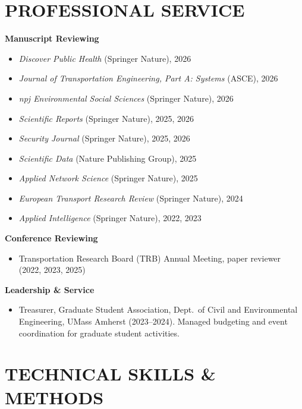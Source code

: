 \documentclass[10pt, a4paper]{article}
\begin{document}
\section{PROFESSIONAL SERVICE}

\textbf{Manuscript Reviewing}
\begin{itemize}
  \item \textit{Discover Public Health} (Springer Nature), 2026
  \item \textit{Journal of Transportation Engineering, Part A: Systems} (ASCE), 2026
  \item \textit{npj Environmental Social Sciences} (Springer Nature), 2026
  \item \textit{Scientific Reports} (Springer Nature), 2025, 2026
  \item \textit{Security Journal} (Springer Nature), 2025, 2026
  \item \textit{Scientific Data} (Nature Publishing Group), 2025
  \item \textit{Applied Network Science} (Springer Nature), 2025
  \item \textit{European Transport Research Review} (Springer Nature), 2024
  \item \textit{Applied Intelligence} (Springer Nature), 2022, 2023
\end{itemize}

\vspace{4pt}
\textbf{Conference Reviewing}
\begin{itemize}
  \item Transportation Research Board (TRB) Annual Meeting, paper reviewer (2022, 2023, 2025)
\end{itemize}

\vspace{4pt}
\textbf{Leadership \& Service}
\begin{itemize}
  \item Treasurer, Graduate Student Association, Dept.\ of Civil and Environmental Engineering, UMass Amherst (2023--2024). Managed budgeting and event coordination for graduate student activities.
\end{itemize}

\section{TECHNICAL SKILLS \& METHODS}
\end{document}

